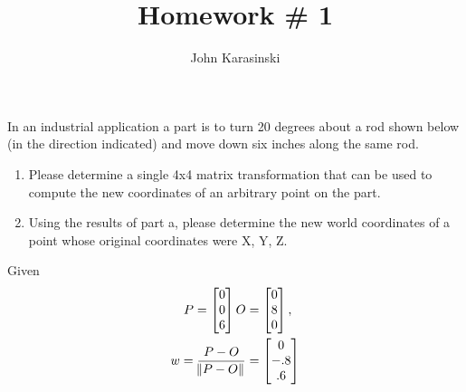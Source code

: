 \documentclass[onecolumn,10pt]{jhwhw}
\author{John Karasinski}
\title{Homework \# 1}
\begin{document}

\problem{}
In an industrial application a part is to turn 20 degrees about a rod shown below (in the direction indicated) and move down six inches along the same rod.
\begin{enumerate}
    \item Please determine a single 4x4 matrix transformation that can be used to compute the new coordinates of an arbitrary point on the part.
    \item Using the results of part a, please determine the new world coordinates of a point whose original coordinates were X, Y, Z.
\end{enumerate}

Given
\begin{align*}
P = 
\begin{bmatrix*}[c]
0 \\
0 \\
6
\end{bmatrix*}
O &=
\begin{bmatrix*}[c]
0 \\
8 \\
0
\end{bmatrix*},\\
w = \dfrac{P - O}{\norm{P - O}} &=
\begin{bmatrix*}[c]
0 \\
-.8 \\
.6
\end{bmatrix*}
\end{align*}
\end{document}
